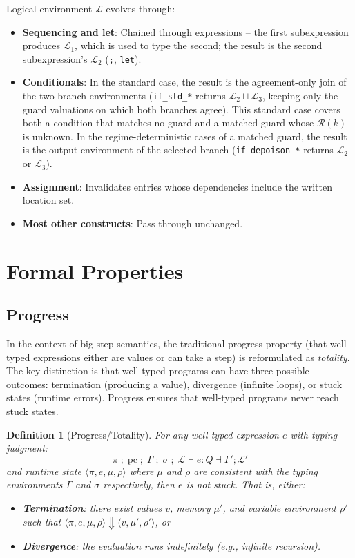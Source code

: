 \documentclass[12pt]{article}
\newtheorem{definition}{Definition}[section]
\begin{document}
Logical environment $\mathcal{L}$ evolves through:
\begin{itemize}
    \item \textbf{Sequencing and let}: Chained through expressions -- the first subexpression produces $\mathcal{L}_1$, which is used to type the second; the result is the second subexpression's $\mathcal{L}_2$ (\texttt{;}, \texttt{let}).
    \item \textbf{Conditionals}: In the standard case, the result is the agreement-only join of the two branch environments (\texttt{if\_std\_*} returns $\mathcal{L}_2 \sqcup \mathcal{L}_3$, keeping only the guard valuations on which both branches agree). This standard case covers both a condition that matches no guard and a matched guard whose $\mathcal{R}(k)$ is unknown. In the regime-deterministic cases of a matched guard, the result is the output environment of the selected branch (\texttt{if\_depoison\_*} returns $\mathcal{L}_2$ or $\mathcal{L}_3$).
    \item \textbf{Assignment}: Invalidates entries whose dependencies include the written location set.
    \item \textbf{Most other constructs}: Pass through unchanged.
\end{itemize}

\section{Formal Properties}
\label{sec:formal-properties}

\subsection{Progress}

In the context of big-step semantics, the traditional progress property (that
well-typed expressions either are values or can take a step) is reformulated as
\emph{totality}. The key distinction is that well-typed programs can have three
possible outcomes: termination (producing a value), divergence (infinite loops),
or stuck states (runtime errors). Progress ensures that well-typed programs
never reach stuck states.

\begin{definition}[Progress/Totality]
For any well-typed expression $e$ with typing judgment:
\[
\pi \; ;\; \text{pc} \; ;\; \Gamma \; ;\; \sigma \; ;\; \mathcal{L} \vdash e : Q \dashv \Gamma' ; \mathcal{L}'
\]
and runtime state $\langle \pi, e, \mu, \rho \rangle$ where $\mu$ and $\rho$ are consistent with the typing environments $\Gamma$ and $\sigma$ respectively, then $e$ is not stuck. That is, either:
\begin{itemize}
    \item \textbf{Termination}: there exist values $v$, memory $\mu'$, and variable environment $\rho'$ such that $\langle \pi, e, \mu, \rho \rangle \Downarrow \langle v, \mu', \rho' \rangle$, or
    \item \textbf{Divergence}: the evaluation runs indefinitely (e.g., infinite recursion).
\end{itemize}
\end{definition}
\end{document}
